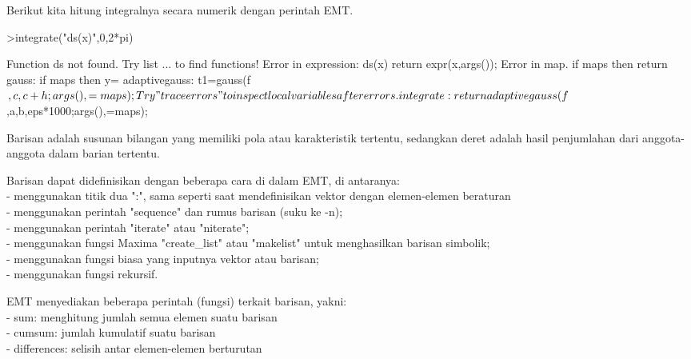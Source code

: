 \documentclass[a4paper,10pt]{article}
\begin{document}
\begin{eulernotebook}
\begin{eulercomment}
\begin{eulercomment}
\begin{eulercomment}
\begin{eulercomment}
\begin{eulercomment}
\begin{eulercomment}
\begin{eulercomment}
\begin{eulercomment}
\begin{eulercomment}
\begin{eulercomment}
\begin{eulercomment}
\begin{eulercomment}
\begin{eulercomment}
\begin{eulercomment}
\begin{eulercomment}
\begin{eulercomment}
\begin{eulercomment}
\begin{eulercomment}
\begin{eulercomment}
\begin{eulercomment}
\begin{eulercomment}
\begin{eulercomment}
\begin{eulercomment}
\begin{eulercomment}
\begin{eulercomment}
Berikut kita hitung integralnya secara numerik dengan perintah EMT.
\end{eulercomment}
\begin{eulerprompt}
>integrate("ds(x)",0,2*pi)
\end{eulerprompt}
\begin{euleroutput}
  Function ds not found.
  Try list ... to find functions!
  Error in expression: ds(x)
      return expr(x,args());
  Error in map.
      if maps then return %
  gauss:
      if maps then y=%
  adaptivegauss:
      t1=gauss(f$,c,c+h;args(),=maps);
  Try "trace errors" to inspect local variables after errors.
  integrate:
      return adaptivegauss(f$,a,b,eps*1000;args(),=maps);
\end{euleroutput}
\begin{eulercomment}
Barisan adalah susunan bilangan yang memiliki pola atau karakteristik
tertentu, sedangkan deret adalah hasil penjumlahan dari
anggota-anggota dalam barian tertentu.

Barisan dapat didefinisikan dengan beberapa cara di dalam EMT, di
antaranya:\\
- menggunakan titik dua ":", sama seperti saat mendefinisikan vektor
dengan elemen-elemen beraturan\\
- menggunakan perintah "sequence" dan rumus barisan (suku ke -n);\\
- menggunakan perintah "iterate" atau "niterate";\\
- menggunakan fungsi Maxima "create\_list" atau "makelist" untuk
menghasilkan barisan simbolik;\\
- menggunakan fungsi biasa yang inputnya vektor atau barisan;\\
- menggunakan fungsi rekursif.

EMT menyediakan beberapa perintah (fungsi) terkait barisan, yakni:\\
- sum: menghitung jumlah semua elemen suatu barisan\\
- cumsum: jumlah kumulatif suatu barisan\\
- differences: selisih antar elemen-elemen berturutan


\end{eulercomment}
\end{eulercomment}
\end{eulercomment}
\end{eulercomment}
\end{eulercomment}
\end{eulercomment}
\end{eulercomment}
\end{eulercomment}
\end{eulercomment}
\end{eulercomment}
\end{eulercomment}
\end{eulercomment}
\end{eulercomment}
\end{eulercomment}
\end{eulercomment}
\end{eulercomment}
\end{eulercomment}
\end{eulercomment}
\end{eulercomment}
\end{eulercomment}
\end{eulercomment}
\end{eulercomment}
\end{eulercomment}
\end{eulercomment}
\end{eulercomment}
\end{eulernotebook}
\end{document}
